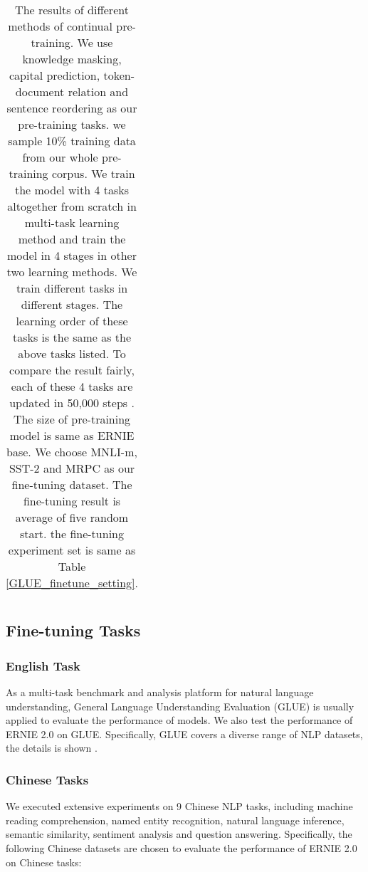 \documentclass[letterpaper]{article} \usepackage{aaai20}  \usepackage{times}  \usepackage{helvet} \usepackage{courier}  \usepackage[hyphens]{url}  \usepackage{graphicx} \usepackage{makecell}
\begin{document}
\begin{table*}[htbp]
\begin{tabular}{c|c|cccc|ccc}
\end{tabular}
\caption{The results of different methods of continual pre-training. We use knowledge masking, capital prediction, token-document relation and sentence reordering as our pre-training tasks. we sample 10\% training data from our whole pre-training corpus. We train the model with 4 tasks altogether from scratch in multi-task learning method and train the model in 4 stages in other two learning methods. We train different tasks in different stages. The learning order of these tasks is the same as the above tasks listed. To compare the result fairly, each of these 4 tasks are updated in 50,000 steps . The size of pre-training model is same as ERNIE base. We choose MNLI-m, SST-2 and MRPC as our fine-tuning dataset. The fine-tuning result is average of five random start. the fine-tuning experiment set is same as Table \ref{GLUE_finetune_setting}.}
  \label{continual_learning}
\end{table*}
\subsection{Fine-tuning Tasks}

\subsubsection{English Task}
As a multi-task benchmark and analysis platform for natural language understanding, General Language Understanding Evaluation (GLUE) is usually applied to evaluate the performance of models. We also test the performance of ERNIE 2.0 on GLUE. Specifically, GLUE covers a diverse range of NLP datasets, the details is shown \cite{wang2018glue}.

\subsubsection{Chinese Tasks}
We executed extensive experiments on 9 Chinese NLP tasks, including machine reading comprehension, named entity recognition, natural language inference, semantic similarity, sentiment analysis and question answering. Specifically, the following Chinese datasets are chosen to evaluate the performance of ERNIE 2.0 on Chinese tasks:
\end{document}
